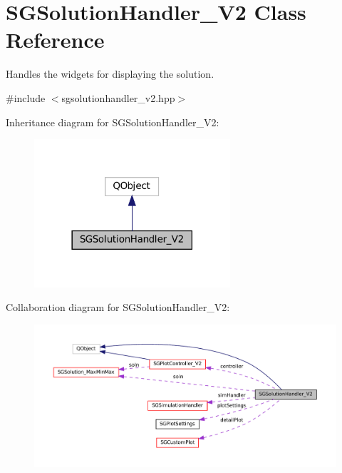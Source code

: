 \hypertarget{classSGSolutionHandler__V2}{}\section{S\+G\+Solution\+Handler\+\_\+\+V2 Class Reference}
\label{classSGSolutionHandler__V2}


Handles the widgets for displaying the solution.  




{\ttfamily \#include $<$sgsolutionhandler\+\_\+v2.\+hpp$>$}



Inheritance diagram for S\+G\+Solution\+Handler\+\_\+\+V2\+:
\nopagebreak
\begin{figure}[H]
\begin{center}
\leavevmode
\includegraphics[width=206pt]{classSGSolutionHandler__V2__inherit__graph}
\end{center}
\end{figure}


Collaboration diagram for S\+G\+Solution\+Handler\+\_\+\+V2\+:
\nopagebreak
\begin{figure}[H]
\begin{center}
\leavevmode
\includegraphics[width=350pt]{classSGSolutionHandler__V2__coll__graph}
\end{center}
\end{figure}
